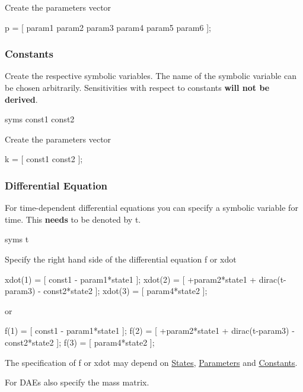 Create the parameters vector


\begin{DoxyCode}
p = [ param1 param2 param3 param4 param5 param6 ]; 
\end{DoxyCode}
\hypertarget{def_simu_constants}{}\subsubsection{Constants}\label{def_simu_constants}
Create the respective symbolic variables. The name of the symbolic variable can be chosen arbitrarily. Sensitivities with respect to constants {\bfseries will not be derived}.


\begin{DoxyCode}
syms const1 const2 
\end{DoxyCode}


Create the parameters vector


\begin{DoxyCode}
k = [ const1 const2 ]; 
\end{DoxyCode}
\hypertarget{def_simu_rhs}{}\subsubsection{Differential Equation}\label{def_simu_rhs}
For time-\/dependent differential equations you can specify a symbolic variable for time. This {\bfseries needs} to be denoted by t.


\begin{DoxyCode}
syms t 
\end{DoxyCode}


Specify the right hand side of the differential equation f or xdot


\begin{DoxyCode}
xdot(1) = [ const1 - param1*state1 ];
xdot(2) = [ +param2*state1 + dirac(t-param3) - const2*state2 ];
xdot(3) = [ param4*state2 ];
\end{DoxyCode}


or


\begin{DoxyCode}
f(1) = [ const1 - param1*state1 ];
f(2) = [ +param2*state1 + dirac(t-param3) - const2*state2 ];
f(3) = [ param4*state2 ];
\end{DoxyCode}


The specification of f or xdot may depend on \hyperlink{def_simu_states}{States}, \hyperlink{def_simu_parameters}{Parameters} and \hyperlink{def_simu_constants}{Constants}.

For D\+A\+Es also specify the mass matrix.


